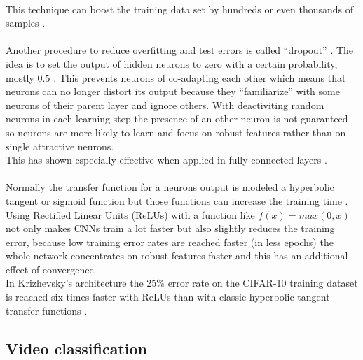 \documentclass[12pt,twoside]{article}
\theoremstyle{plain}
\theoremstyle{definition}
\theoremstyle{remark}
\begin{document}
\\
This technique can boost the training data set by hundreds or even thousands of samples \cite{ImangeNetClassificationCNN-Krizhevsky}.
\\
\\
Another procedure to reduce overfitting and test errors is called \enquote{dropout} \cite{ImprovingNeuralNetworksDropout-Hinton-Krizhevsky}. The idea is to set the output of hidden neurons to zero with a certain probability, mostly $0.5$ \cite{ImangeNetClassificationCNN-Krizhevsky}. This prevents neurons of co-adapting each other which means that neurons can no longer distort its output because they \enquote{familiarize} with some neurons of their parent layer and ignore others. With deactiviting random neurons in each learning step the presence of an other neuron is not guaranteed so neurons are more likely to learn and focus on robust features rather than on single attractive neurons.
\\
This has shown especially effective when applied in fully-connected layers \cite{ImangeNetClassificationCNN-Krizhevsky}.
\\
\\
Normally the transfer function for a neurons output is modeled a hyperbolic tangent or sigmoid function but those functions can increase the training time \cite{ImangeNetClassificationCNN-Krizhevsky}. Using Rectified Linear Units (ReLUs) \cite{RectifiedLinearUnits-Hinton} with a function like $f(x) = max(0, x)$ not only makes CNNs train a lot faster but also slightly reduces the training error, because low training error rates are reached faster (in less epochs) the whole network concentrates on robust features faster and this has an additional effect of convergence.
\\
In Krizhevsky's architecture the 25\% error rate on the CIFAR-10 training dataset is reached six times faster with ReLUs than with classic hyperbolic tangent transfer functions \cite{ImangeNetClassificationCNN-Krizhevsky}.


\subsection{Video classification}
\end{document}
